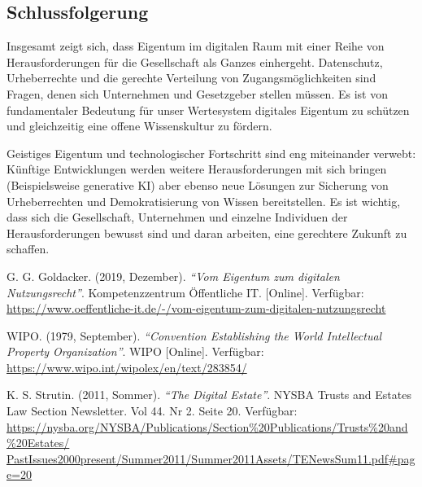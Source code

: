 \documentclass[journal]{IEEEtran}
\begin{document}
\begin{onecolumn}
\section{Schlussfolgerung}

Insgesamt zeigt sich, dass Eigentum im digitalen Raum mit einer Reihe von 
Herausforderungen für die Gesellschaft als Ganzes einhergeht. Datenschutz, Urheberrechte 
und die gerechte Verteilung von Zugangsmöglichkeiten sind Fragen, denen sich Unternehmen 
und Gesetzgeber stellen müssen. Es ist von fundamentaler Bedeutung für unser Wertesystem 
digitales Eigentum zu schützen und gleichzeitig eine offene Wissenskultur zu fördern.

Geistiges Eigentum und technologischer Fortschritt sind eng miteinander verwebt: Künftige 
Entwicklungen werden weitere Herausforderungen mit sich bringen (Beispielsweise generative 
KI) aber ebenso neue Lösungen zur Sicherung von Urheberrechten und Demokratisierung von 
Wissen bereitstellen. Es ist wichtig, dass sich die Gesellschaft, Unternehmen und einzelne 
Individuen der Herausforderungen bewusst sind und daran arbeiten, eine gerechtere Zukunft 
zu schaffen. 

\begin{thebibliography}{1}

 G. G. Goldacker. (2019, Dezember). {\em ``Vom Eigentum zum digitalen Nutzungsrecht''}.
Kompetenzzentrum Öffentliche IT. [Online]. Verfügbar:
\url{https://www.oeffentliche-it.de/-/vom-eigentum-zum-digitalen-nutzungsrecht}

 WIPO. (1979, September).
{\em ``Convention Establishing the World Intellectual Property Organization''}.
WIPO [Online]. Verfügbar: \url{https://www.wipo.int/wipolex/en/text/283854/}

 K. S. Strutin. (2011, Sommer). {\em``The Digital Estate''}.
NYSBA Trusts and Estates Law Section Newsletter. Vol 44. Nr 2. Seite 20. Verfügbar:
\url{https://nysba.org/NYSBA/Publications/Section\%20Publications/Trusts\%20and\%20Estates/
PastIssues2000present/Summer2011/Summer2011Assets/TENewsSum11.pdf#page=20}

\end{thebibliography}

\end{onecolumn}
\end{document}
